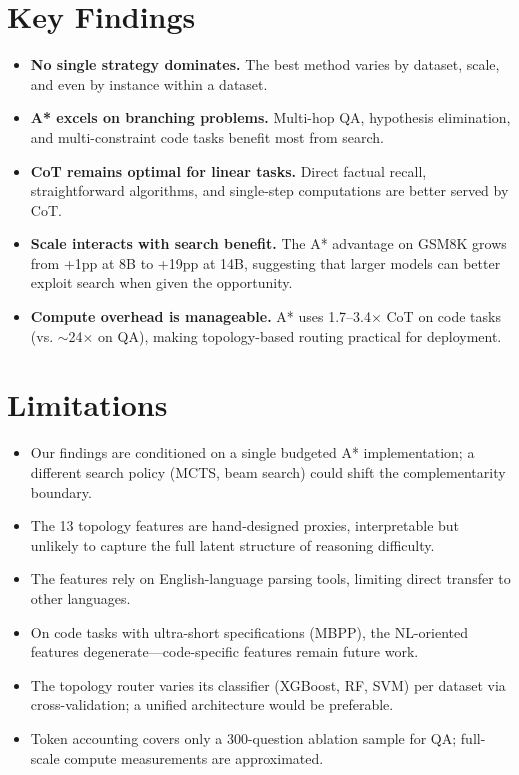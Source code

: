 \section{Key Findings}

\begin{itemize}
\item \textbf{No single strategy dominates.} The best method varies by dataset, scale, and even by instance within a dataset.
\item \textbf{A* excels on branching problems.} Multi-hop QA, hypothesis elimination, and multi-constraint code tasks benefit most from search.
\item \textbf{CoT remains optimal for linear tasks.} Direct factual recall, straightforward algorithms, and single-step computations are better served by CoT.
\item \textbf{Scale interacts with search benefit.} The A* advantage on GSM8K grows from +1pp at 8B to +19pp at 14B, suggesting that larger models can better exploit search when given the opportunity.
\item \textbf{Compute overhead is manageable.} A* uses 1.7--3.4$\times$ CoT on code tasks (vs. $\sim$24$\times$ on QA), making topology-based routing practical for deployment.
\end{itemize}

\section{Limitations}

\begin{itemize}
\item Our findings are conditioned on a single budgeted A* implementation; a different search policy (MCTS, beam search) could shift the complementarity boundary.
\item The 13 topology features are hand-designed proxies, interpretable but unlikely to capture the full latent structure of reasoning difficulty.
\item The features rely on English-language parsing tools, limiting direct transfer to other languages.
\item On code tasks with ultra-short specifications (MBPP), the NL-oriented features degenerate---code-specific features remain future work.
\item The topology router varies its classifier (XGBoost, RF, SVM) per dataset via cross-validation; a unified architecture would be preferable.
\item Token accounting covers only a 300-question ablation sample for QA; full-scale compute measurements are approximated.
\end{itemize}

